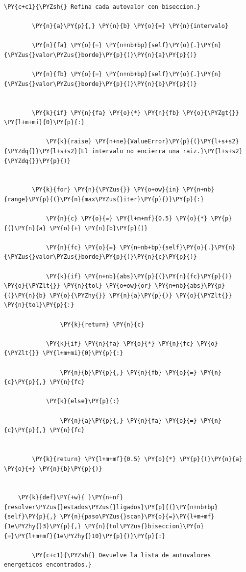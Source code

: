 \documentclass[11pt]{article}
\makeatletter
\def\PY@reset{\let\PY@it=\relax \let\PY@bf=\relax \let\PY@ul=\relax \let\PY@tc=\relax \let\PY@bc=\relax \let\PY@ff=\relax}
\def\PY@tok#1{\csname PY@tok@#1\endcsname}
\def\PY@toks#1+{\ifx\relax#1\empty\else \PY@tok{#1}\expandafter\PY@toks\fi}
\def\PY@do#1{\PY@bc{\PY@tc{\PY@ul{\PY@it{\PY@bf{\PY@ff{#1}}}}}}}
\def\PY#1#2{\PY@reset\PY@toks#1+\relax+\PY@do{#2}}
\makeatother
\begin{document}
\begin{tcolorbox}[breakable, size=fbox, boxrule=1pt, pad at break*=1mm,colback=cellbackground, colframe=cellborder]
\begin{Verbatim}[commandchars=\\\{\}]
        \PY{c+c1}{\PYZsh{} Refina cada autovalor con biseccion.}

        \PY{n}{a}\PY{p}{,} \PY{n}{b} \PY{o}{=} \PY{n}{intervalo}

        \PY{n}{fa} \PY{o}{=} \PY{n+nb+bp}{self}\PY{o}{.}\PY{n}{\PYZus{}valor\PYZus{}borde}\PY{p}{(}\PY{n}{a}\PY{p}{)}

        \PY{n}{fb} \PY{o}{=} \PY{n+nb+bp}{self}\PY{o}{.}\PY{n}{\PYZus{}valor\PYZus{}borde}\PY{p}{(}\PY{n}{b}\PY{p}{)}


        \PY{k}{if} \PY{n}{fa} \PY{o}{*} \PY{n}{fb} \PY{o}{\PYZgt{}} \PY{l+m+mi}{0}\PY{p}{:}

            \PY{k}{raise} \PY{n+ne}{ValueError}\PY{p}{(}\PY{l+s+s2}{\PYZdq{}}\PY{l+s+s2}{El intervalo no encierra una raiz.}\PY{l+s+s2}{\PYZdq{}}\PY{p}{)}


        \PY{k}{for} \PY{n}{\PYZus{}} \PY{o+ow}{in} \PY{n+nb}{range}\PY{p}{(}\PY{n}{max\PYZus{}iter}\PY{p}{)}\PY{p}{:}

            \PY{n}{c} \PY{o}{=} \PY{l+m+mf}{0.5} \PY{o}{*} \PY{p}{(}\PY{n}{a} \PY{o}{+} \PY{n}{b}\PY{p}{)}

            \PY{n}{fc} \PY{o}{=} \PY{n+nb+bp}{self}\PY{o}{.}\PY{n}{\PYZus{}valor\PYZus{}borde}\PY{p}{(}\PY{n}{c}\PY{p}{)}

            \PY{k}{if} \PY{n+nb}{abs}\PY{p}{(}\PY{n}{fc}\PY{p}{)} \PY{o}{\PYZlt{}} \PY{n}{tol} \PY{o+ow}{or} \PY{n+nb}{abs}\PY{p}{(}\PY{n}{b} \PY{o}{\PYZhy{}} \PY{n}{a}\PY{p}{)} \PY{o}{\PYZlt{}} \PY{n}{tol}\PY{p}{:}

                \PY{k}{return} \PY{n}{c}

            \PY{k}{if} \PY{n}{fa} \PY{o}{*} \PY{n}{fc} \PY{o}{\PYZlt{}} \PY{l+m+mi}{0}\PY{p}{:}

                \PY{n}{b}\PY{p}{,} \PY{n}{fb} \PY{o}{=} \PY{n}{c}\PY{p}{,} \PY{n}{fc}

            \PY{k}{else}\PY{p}{:}

                \PY{n}{a}\PY{p}{,} \PY{n}{fa} \PY{o}{=} \PY{n}{c}\PY{p}{,} \PY{n}{fc}


        \PY{k}{return} \PY{l+m+mf}{0.5} \PY{o}{*} \PY{p}{(}\PY{n}{a} \PY{o}{+} \PY{n}{b}\PY{p}{)}


    \PY{k}{def}\PY{+w}{ }\PY{n+nf}{resolver\PYZus{}estados\PYZus{}ligados}\PY{p}{(}\PY{n+nb+bp}{self}\PY{p}{,} \PY{n}{paso\PYZus{}scan}\PY{o}{=}\PY{l+m+mf}{1e\PYZhy{}3}\PY{p}{,} \PY{n}{tol\PYZus{}biseccion}\PY{o}{=}\PY{l+m+mf}{1e\PYZhy{}10}\PY{p}{)}\PY{p}{:}

        \PY{c+c1}{\PYZsh{} Devuelve la lista de autovalores energeticos encontrados.}


\end{Verbatim}
\end{tcolorbox}
\end{document}
